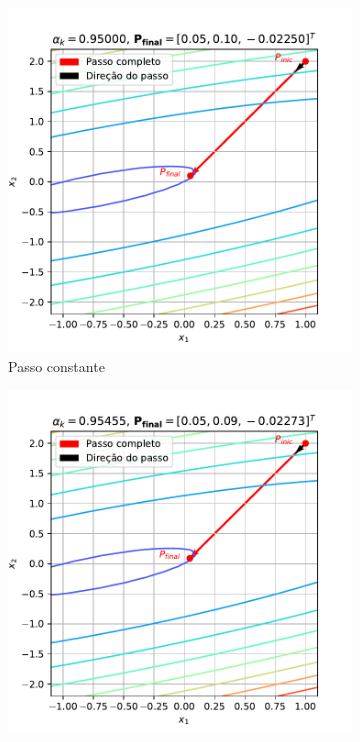\documentclass[10pt, a4paper]{article}
\begin{document}
\begin{figure}
  \centering
  \begin{subfigure}[b]{0.32\textwidth}
      \centering
      \includegraphics[width=\textwidth]{images/q2a_1.pdf}
      \caption{Passo constante}
      \label{fig:q2a_1}
  \end{subfigure}
  \hfill
  \begin{subfigure}[b]{0.32\textwidth}
      \centering
      \includegraphics[width=\textwidth]{images/q2a_2.pdf}

\end{subfigure}
\end{figure}
\end{document}
